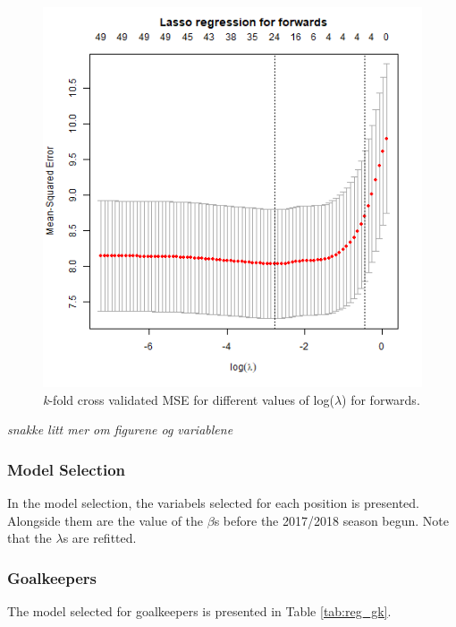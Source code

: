 \begin{figure}[H]
    \centering
    \includegraphics[scale=0.55]{fig/chapter_6/lasso_FWD.png}
    \caption{\textit{k}-fold cross validated MSE for different values of log($\lambda$) for forwards.}
\label{fig:lasso_FWD}    
\end{figure}




\textit{snakke litt mer om figurene og variablene}

\subsubsection{Model Selection}
In the model selection, the variabels selected for each position is presented. Alongside them are the value of the $\beta$s before the 2017/2018 season begun. Note that the $\lambda$s are refitted. 

\subsubsection{Goalkeepers}
The model selected for goalkeepers is presented in Table \ref{tab:reg_gk}.


